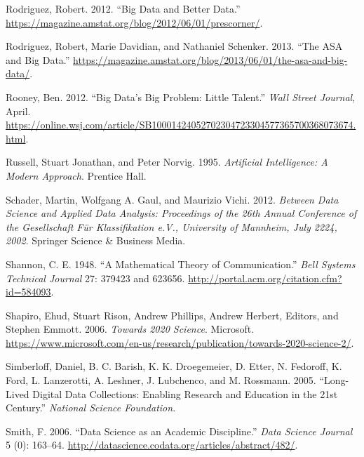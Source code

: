 \documentclass[
  letterpaper,
]{report}
\newlength{\cslhangindent}
\newlength{\cslentryspacingunit} %
\newenvironment{CSLReferences}[2] %
 {%
  \setlength{\parindent}{0pt}
  \ifodd #1
  \let\oldpar\par
  \def\par{\hangindent=\cslhangindent\oldpar}
  \fi
  \setlength{\parskip}{#2\cslentryspacingunit}
 }%
 {}
\begin{document}
\begin{CSLReferences}{1}{0}
\leavevmode{}%
Rodriguez, Robert. 2012. {``Big Data and Better Data.''}
\url{https://magazine.amstat.org/blog/2012/06/01/prescorner/}.

\leavevmode{}%
Rodriguez, Robert, Marie Davidian, and Nathaniel Schenker. 2013. {``The
ASA and Big Data.''}
\url{https://magazine.amstat.org/blog/2013/06/01/the-asa-and-big-data/}.

\leavevmode{}%
Rooney, Ben. 2012. {``Big Data's Big Problem: Little Talent.''}
\emph{Wall Street Journal}, April.
\url{https://online.wsj.com/article/SB10001424052702304723304577365700368073674.html}.

\leavevmode{}%
Russell, Stuart Jonathan, and Peter Norvig. 1995. \emph{Artificial
Intelligence: A Modern Approach}. Prentice Hall.

\leavevmode{}%
Schader, Martin, Wolfgang A. Gaul, and Maurizio Vichi. 2012.
\emph{Between Data Science and Applied Data Analysis: Proceedings of the
26th Annual Conference of the Gesellschaft Für Klassifikation e.V.,
University of Mannheim, July 22{\textendash}24, 2002}. Springer Science
\& Business Media.

\leavevmode{}%
Shannon, C. E. 1948. {``A Mathematical Theory of Communication.''}
\emph{Bell Systems Technical Journal} 27: 379423 and 623656.
\url{http://portal.acm.org/citation.cfm?id=584093}.

\leavevmode{}%
Shapiro, Ehud, Stuart Rison, Andrew Phillips, Andrew Herbert, Editors,
and Stephen Emmott. 2006. \emph{Towards 2020 Science}. Microsoft.
\url{https://www.microsoft.com/en-us/research/publication/towards-2020-science-2/}.

\leavevmode{}%
Simberloff, Daniel, B. C. Barish, K. K. Droegemeier, D. Etter, N.
Fedoroff, K. Ford, L. Lanzerotti, A. Leshner, J. Lubchenco, and M.
Rossmann. 2005. {``Long-Lived Digital Data Collections: Enabling
Research and Education in the 21st Century.''} \emph{National Science
Foundation}.

\leavevmode{}%
Smith, F. 2006. {``Data Science as an Academic Discipline.''} \emph{Data
Science Journal} 5 (0): 163--64.
\url{http://datascience.codata.org/articles/abstract/482/}.


\end{CSLReferences}
\end{document}
